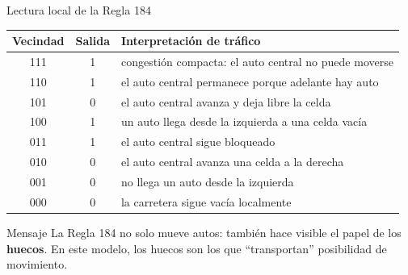 \begin{frame}{Lectura local de la Regla 184}
\small
\begin{center}
\begin{tabular}{c|c|p{}}
\toprule
Vecindad & Salida & Interpretación de tráfico \\
\midrule
111 & 1 & congestión compacta: el auto central no puede moverse \\
110 & 1 & el auto central permanece porque adelante hay auto \\
101 & 0 & el auto central avanza y deja libre la celda \\
100 & 1 & un auto llega desde la izquierda a una celda vacía \\
011 & 1 & el auto central sigue bloqueado \\
010 & 0 & el auto central avanza una celda a la derecha \\
001 & 0 & no llega un auto desde la izquierda \\
000 & 0 & la carretera sigue vacía localmente \\
\bottomrule
\end{tabular}
\end{center}

\begin{block}{Mensaje}
La Regla 184 no solo mueve autos: también hace visible el papel de los \textbf{huecos}. En este modelo, los huecos son los que ``transportan'' posibilidad de movimiento.
\end{block}
\end{frame}

